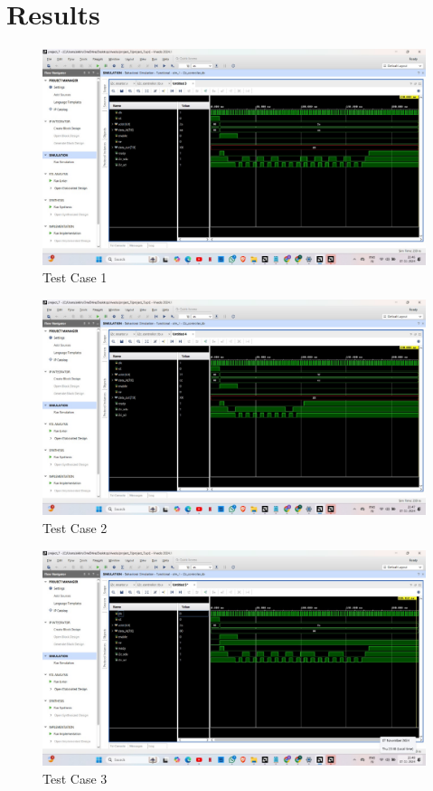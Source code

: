 \documentclass[a4paper,12pt]{report}
\begin{document}
\chapter{Results}
\begin{figure}[h!]
    \centering
    \includegraphics[width=\textwidth]{TEST-CASE-1.jpg}
    \caption{Test Case 1}
\end{figure}
\begin{figure}[h!]
    \centering
    \includegraphics[width=\textwidth]{TEST-CASE-2.jpg}
    \caption{Test Case 2}
\end{figure}

\begin{figure}[h!]
    \centering
    \includegraphics[width=\textwidth]{TEST-CASE-3.jpg}
    \caption{Test Case 3}
\end{figure}
\newpage
\end{document}
